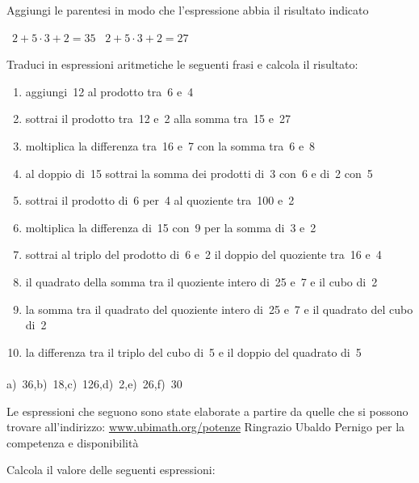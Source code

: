 \begin{esercizio}
Aggiungi le parentesi in modo che l'espressione abbia il risultato indicato
 \begin{multicols}{2}
 \begin{center}
 ~\(2+5\cdot3+2=35\)
~\(2+5\cdot3+2=27\)
 \end{center}
 \end{multicols}
\end{esercizio}

\begin{esercizio}[*]
Traduci in espressioni aritmetiche le seguenti frasi e calcola il risultato:
 \begin{enumerate}[noitemsep, label=(\alph*)]
 \item aggiungi~12 al prodotto tra~6 e~4
 \item sottrai il prodotto tra~12 e~2 alla somma tra~15 e~27
 \item moltiplica la differenza tra~16 e~7 con la somma tra~6 e~8
 \item al doppio di~15 sottrai la somma dei prodotti di~3 con~6 e di~2 con~5
 \item sottrai il prodotto di~6 per~4 al quoziente tra~100 e~2
 \item moltiplica la differenza di~15 con~9 per la somma di~3 e~2
 \item sottrai al triplo del prodotto di~6 e~2 il doppio del quoziente tra~16 
e~4
 \item il quadrato della somma tra il quoziente intero di~25 e~7 e il cubo 
di~2
 \item la somma tra il quadrato del quoziente intero di~25 e~7 e il quadrato 
del cubo di~2
 \item la differenza tra il triplo del cubo di~5 e il doppio del quadrato di~5
 \end{enumerate}
\paragraph{} a)~36,\quad b)~18,\quad c)~126,\quad d)~2,\quad e)~26,\quad f)~30


\end{esercizio}

Le espressioni che seguono sono state elaborate a partire da quelle che si 
possono trovare all'indirizzo:
\href{http:// www.ubimath.org/potenze}{ www.ubimath.org/potenze}
Ringrazio Ubaldo Pernigo per la competenza e disponibilità

Calcola il valore delle seguenti espressioni:


